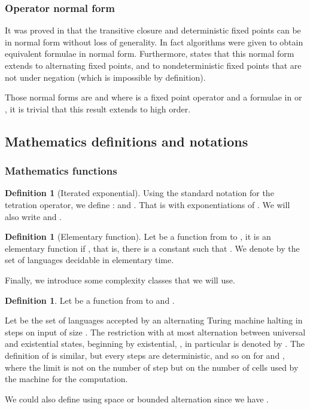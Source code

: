 \documentclass[a4paper,12pt]{article}
\newcommand{\sss}[1]{\subsubsection{#1}}
\theoremstyle{definition}
\newtheorem{definition}[theorem]{Definition}
\begin{document}
\sss{Operator normal form}\label{opnorm}

It was proved in \cite{imm} that the transitive closure and
deterministic fixed points can be in normal form without loss of
generality. In fact algorithms were given to obtain equivalent formulae
in normal form. Furthermore, \cite{nfp} states that this normal form extends to
alternating fixed points, and to nondeterministic fixed points that
are not under negation (which is impossible by definition).

Those normal forms are  and
 where  is a fixed point operator and
 a formulae in  or , it is trivial that this result
extends to high order.

\subsection{Mathematics definitions and notations}

\sss{Mathematics functions}
\begin{definition}[Iterated exponential] Using the standard notation for the tetration operator, we define :
   and . That is
   with  exponentiations of
  .
We will also write 
  and .
\end{definition}

\begin{definition}[Elementary function]
  Let  be a function from  to , it is an elementary
  function if , that is, there is a constant
   such that . We denote by  the
  set of languages decidable in elementary time.
\end{definition}

Finally, we introduce some complexity classes that we will use.
\begin{definition}
  Let  be a function from  to  and .


  Let  be the set of languages accepted by an alternating
  Turing machine halting in  steps on input of size . The
  restriction with at most  alternation between universal and
  existential states, beginning by existential, ,
  in particular  is denoted by . The
  definition of  is similar, but every steps are
  deterministic, and so on for  and , where
  the limit is not on the number of step but on the number of cells
  used by the machine for the computation.

  
\end{definition}

We could also define \ELEMENTARY{} using space or bounded alternation
since we have .
\end{document}
